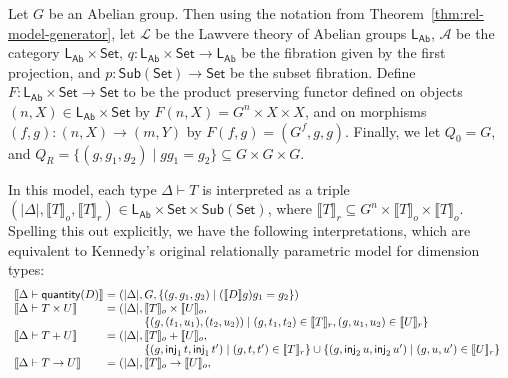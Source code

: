 \documentclass[a4paper,UKenglish]{lipics}
\theoremstyle{plain}
\newcommand{\msf}[1]{\mathsf{#1}} %
\newcommand{\Set}{\msf{Set}}
\newcommand{\Sub}[1]{\msf{Sub}(#1)}
\newcommand{\LAb}{\msf{L}_{\msf{Ab}}}
\newcommand{\A}{\mathcal{A}}
\newcommand{\sem}[1]{\ensuremath{\llbracket #1 \rrbracket}}
\newcommand{\semo}[1]{\ensuremath{\llbracket #1 \rrbracket _o}}
\newcommand{\semr}[1]{\ensuremath{\llbracket #1 \rrbracket _r}}
\newcommand{\qnt}{\msf{quantity}}
\newcommand{\inj}{\mathsf{inj}}
\begin{document}
\begin{example}\label{ex:relKen}
Let $G$ be an Abelian group. Then using the notation from
Theorem~\ref{thm:rel-model-generator}, let
$\mathcal{L}$ be the Lawvere theory of Abelian groups $\LAb$, $\A$
be the category $\LAb \times \Set$, $q: \LAb \times \Set \rightarrow
\LAb$ be the fibration given by the first projection, and
$p:\Sub{\Set}\rightarrow \Set$ be the subset fibration. Define
$F:\LAb \times \Set \rightarrow \Set$ to be the product preserving
functor defined on objects $(n,X) \in \LAb \times \Set$ by $F(n, X)
= G^{n} \times X \times X$, and on morphisms $(f, g) : (n,X)
\rightarrow (m, Y)$ by $F(f,g) = (G^f, g, g)$. Finally, we let $Q_0
= G$, and $Q_R = \{(g,g_1,g_2) \mathrel| gg_1 = g_2 \} \subseteq G
\times G \times G$.

In this model, each type $\Delta \vdash T$ is interpreted as a triple $(|\Delta|, \semo{T}, \semr{T}) \in \LAb \times \Set \times \Sub{\Set}$, where $\semr{T} \subseteq G^n \times \semo{T} \times \semo{T}$. Spelling this out explicitly, we have the following interpretations, which are equivalent to Kennedy's original relationally parametric model for dimension types:
  \begin{displaymath}
    \begin{array}{l@{\hspace{0.3em}}c@{\hspace{0.3em}}l}
      \sem{\Delta \vdash \qnt(D)} & = & (|\Delta|, G, \{ (g, g_1, g_2) \mathrel| (\sem{D}g)g_1 = g_2 \}) \\
      \sem{\Delta \vdash T \times U} & = &
      (|\Delta|,
      \begin{array}[t]{@{}l}
        \semo{T} \times \semo{U}, \\
        \{ (g, (t_1,u_1), (t_2,u_2)) \mathrel| (g,t_1,t_2) \in \semr{T}, (g,u_1,u_2) \in \semr{U} \}
      \end{array}
      \\
      \sem{\Delta \vdash T + U} & = &
      (|\Delta|,
      \begin{array}[t]{@{}l}
        \semo{T} + \semo{U}, \\
        \{ (g, \inj_1\,t,\inj_1\,t') \mathrel| (g,t,t') \in \semr{T} \}
        \cup
        \{ (g, \inj_2\,u,\inj_2\,u') \mathrel| (g,u,u') \in \semr{U} \}
      \end{array}
      \\
      \sem{\Delta \vdash T \to U} & = &
      (|\Delta|,
      \begin{array}[t]{@{}l}
        \semo{T} \to \semo{U}, \\

\end{array}
\end{array}
\end{displaymath}
\end{example}
\end{document}
